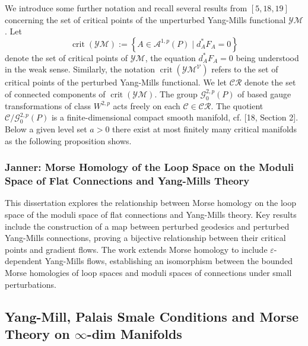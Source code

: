 \documentclass[10pt, letterpaper]{article}
\theoremstyle{custom}
\theoremstyle{definition}
\begin{document}
{\small
We introduce some further notation and recall several results from $[5,18,19]$ concerning the set of critical points of the unperturbed Yang-Mills functional $\mathcal{Y} \mathcal{M}$. Let
$$
\operatorname{crit}(\mathcal{Y} \mathcal{M}):=\left\{A \in \mathcal{A}^{1, p}(P) \mid d_A^* F_A=0\right\}
$$
denote the set of critical points of $\mathcal{Y} \mathcal{M}$, the equation $d_A^* F_A=0$ being understood in the weak sense. Similarly, the notation $\operatorname{crit}\left(\mathcal{Y} \mathcal{M}^{\mathcal{V}}\right)$ refers to the set of critical points of the perturbed Yang-Mills functional. We let $\mathcal{C R}$ denote the set of connected components of $\operatorname{crit}(\mathcal{Y} \mathcal{M})$. The group $\mathcal{G}_0^{2, p}(P)$ of based gauge transformations of class $W^{2, p}$ acts freely on each $\mathcal{C} \in \mathcal{C R}$. The quotient $\mathcal{C} / \mathcal{G}_0^{2, p}(P)$ is a finite-dimensional compact smooth manifold, cf. [18, Section 2]. Below a given level set $a>0$ there exist at most finitely many critical manifolds as the following proposition shows.}


\subsubsection{Janner: Morse Homology of the Loop Space on the Moduli Space of Flat Connections and Yang-Mills Theory \cite{janner2010morse}} 
This dissertation explores the relationship between Morse homology on the loop space of the moduli space of flat connections and Yang-Mills theory. Key results include the construction of a map between perturbed geodesics and perturbed Yang-Mills connections, proving a bijective relationship between their critical points and gradient flows. The work extends Morse homology to include $\varepsilon$-dependent Yang-Mills flows, establishing an isomorphism between the bounded Morse homologies of loop spaces and moduli spaces of connections under small perturbations.




\vspace{1cm}

\subsection{Yang-Mill, Palais Smale Conditions and Morse Theory on $\infty$-dim Manifolds}
\end{document}
